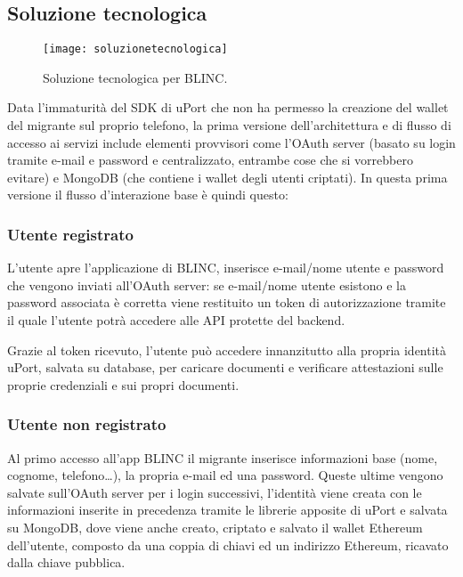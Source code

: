 \subsection{Soluzione tecnologica}

\begin{figure}[!ht]
    \texttt{[image: soluzionetecnologica]}
    \caption{Soluzione tecnologica per BLINC.}
    \label{fig:soluzionetecnologica}
\end{figure}

Data l’immaturità del SDK di uPort che non ha permesso la creazione del wallet del migrante sul proprio telefono, la prima versione 
dell’architettura e di flusso di accesso ai servizi include elementi provvisori come l’OAuth server
(basato su login tramite e-mail e password e centralizzato, 
entrambe cose che si vorrebbero evitare) e MongoDB (che contiene i wallet degli utenti criptati).	
In questa prima versione il flusso d’interazione base è quindi questo:

\subsubsection{Utente registrato}

L’utente apre l’applicazione di BLINC, inserisce e-mail/nome utente e password che vengono inviati all’OAuth server:
se e-mail/nome utente esistono e la password associata è corretta viene restituito un token di autorizzazione
tramite il quale l’utente
potrà accedere alle API protette del backend.

Grazie al token ricevuto, l’utente può accedere innanzitutto alla propria identità uPort, salvata su database, 
per caricare documenti e verificare attestazioni sulle proprie credenziali e sui propri documenti.

\subsubsection{Utente non registrato}

Al primo accesso all’app BLINC il migrante inserisce informazioni base (nome, cognome, telefono…),
la propria e-mail ed una password. Queste ultime vengono salvate sull’OAuth server per i login successivi, 
l’identità viene creata con le informazioni inserite in precedenza tramite le librerie apposite di uPort 
e salvata su MongoDB, dove viene anche creato, criptato e salvato il wallet Ethereum dell’utente,
composto da una coppia di chiavi ed un indirizzo Ethereum, ricavato dalla chiave pubblica.


